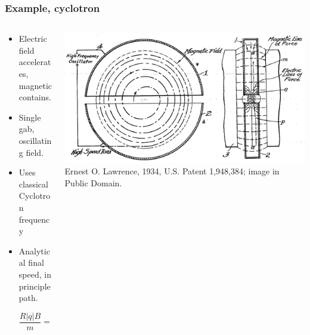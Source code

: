 \documentclass{beamer}
\begin{document}
\begin{frame}
\frametitle{Example, cyclotron}
\begin{columns}
\begin{column}{0.5\linewidth}
\begin{itemize}
\item<1-> Electric field accelerates, magnetic contains.

\item<2-> Single gab, oscillating field.

\item<3-> Uses classical Cyclotron frequency

\item<4-> Analytical final speed, in principle path.

\begin{equation*}
\frac{R|q|B}{m} = v_\perp
\end{equation*}

\end{itemize}
\end{column}
\begin{column}{0.5\linewidth}
\includegraphics[width=\linewidth]{ Cyclotron_patent.png}
{\color{gray} Ernest O. Lawrence, 1934, U.S. Patent 1,948,384; image in Public Domain.}
\end{column}
\end{columns}
\end{frame}
\end{document}
